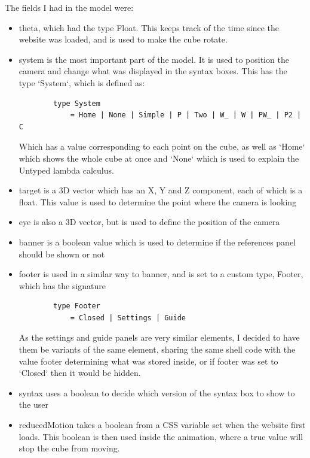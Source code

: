 \documentclass{l4proj}
\begin{document}
The fields I had in the model were:
\begin{itemize}
    \item theta, which had the type Float.  This keeps track of the time since the website was loaded, and is used to make the cube rotate.

    \item system is the most important part of the model.  It is used to position the camera and change what was displayed in the syntax boxes.  This has the type `System`, which is defined as: 

    \begin{lstlisting}
        type System
            = Home | None | Simple | P | Two | W_ | W | PW_ | P2 | C
    \end{lstlisting}
    Which has a value corresponding to each point on the cube, as well as `Home` which shows the whole cube at once and `None` which is used to explain the Untyped lambda calculus.

    \item target is a 3D vector which has an X, Y and Z component, each of which is a float.  This value is used to determine the point where the camera is looking

    \item eye is also a 3D vector, but is used to define the position of the camera

    \item banner is a boolean value which is used to determine if the references panel should be shown or not

    \item footer is used in a similar way to banner, and is set to a custom type, Footer, which has the signature
    
    \begin{lstlisting}
        type Footer
            = Closed | Settings | Guide
    \end{lstlisting}

    As the settings and guide panels are very similar elements, I decided to have them be variants of the same element,  sharing the same shell code with the value footer determining what was stored inside, or if footer was set to `Closed` then it would be hidden.

    \item syntax uses a boolean to decide which version of the syntax box to show to the user

    \item reducedMotion takes a boolean from a CSS variable set when the website first loads.  This boolean is then used inside the animation, where a true value will stop the cube from moving.


\end{itemize}
\end{document}
